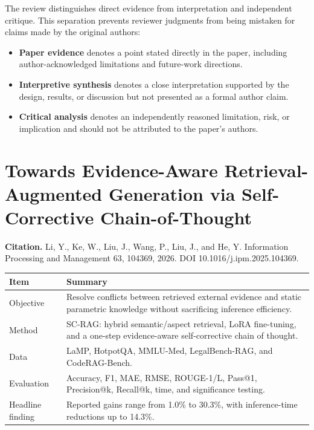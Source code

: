 \documentclass[11pt]{article}
\newcounter{none} %
\begin{document}
The review distinguishes direct evidence from interpretation and
independent critique. This separation prevents reviewer judgments from
being mistaken for claims made by the original authors:

\begin{itemize}
\item
  \textbf{Paper evidence} denotes a point stated directly in the paper,
  including author-acknowledged limitations and future-work directions.
\item
  \textbf{Interpretive synthesis} denotes a close interpretation
  supported by the design, results, or discussion but not presented as a
  formal author claim.
\item
  \textbf{Critical analysis} denotes an independently reasoned
  limitation, risk, or implication and should not be attributed to the
  paper's authors.
\end{itemize}

\clearpage
\section{Towards Evidence-Aware Retrieval-Augmented Generation via
Self-Corrective
Chain-of-Thought}\label{towards-evidence-aware-retrieval-augmented-generation-via-self-corrective-chain-of-thought}

\textbf{Citation.} Li, Y., Ke, W., Liu, J., Wang, P., Liu, J., and He,
Y. Information Processing and Management 63, 104369, 2026. DOI
10.1016/j.ipm.2025.104369.

{\def\LTcaptype{none} %
\begin{longtable}[]{@{}
  >{\raggedright\arraybackslash}p{}
  >{\raggedright\arraybackslash}p{}@{}}
\toprule\noalign{}
\begin{minipage}[b]{\linewidth}\centering
\textbf{Item}
\end{minipage} & \begin{minipage}[b]{\linewidth}\centering
\textbf{Summary}
\end{minipage} \\
\midrule\noalign{}
\endhead
\bottomrule\noalign{}
\endlastfoot
Objective & Resolve conflicts between retrieved external evidence and
static parametric knowledge without sacrificing inference efficiency. \\
Method & SC-RAG: hybrid semantic/aspect retrieval, LoRA fine-tuning, and
a one-step evidence-aware self-corrective chain of thought. \\
Data & LaMP, HotpotQA, MMLU-Med, LegalBench-RAG, and CodeRAG-Bench. \\
Evaluation & Accuracy, F1, MAE, RMSE, ROUGE-1/L, Pass@1, Precision@k,
Recall@k, time, and significance testing. \\
Headline finding & Reported gains range from 1.0\% to 30.3\%, with
inference-time reductions up to 14.3\%. \\
\end{longtable}
}
\end{document}
